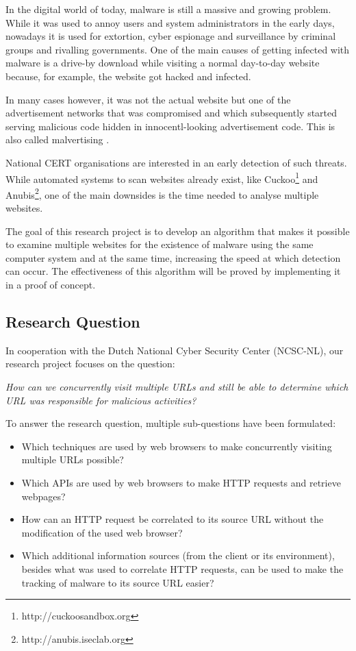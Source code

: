 In the digital world of today, malware is still a massive and growing problem. While it was used to annoy users and system administrators in the early days, nowadays it is used for extortion, cyber espionage and surveillance by criminal groups and rivalling governments. One of the main causes of getting infected with malware is a drive-by download while visiting a normal day-to-day website because, for example, the website got hacked and infected. 

In many cases \cite{proofpoint,foxittelegraaf,foxityahoo} however, it was not the actual website but one of the advertisement networks that was compromised and which subsequently started serving malicious code hidden in innocentl-looking advertisement code. This is also called malvertising \cite{Li2012}.

National CERT organisations are interested in an early detection of such threats. While automated systems to scan websites already exist, like Cuckoo\footnote{http://cuckoosandbox.org} and Anubis\footnote{http://anubis.iseclab.org}, one of the main downsides is the time needed to analyse multiple websites.

The goal of this research project is to develop an algorithm that makes it possible to examine multiple websites for the existence of malware using the same computer system and at the same time, increasing the speed at which detection can occur. The effectiveness of this algorithm will be proved by implementing it in a proof of concept.

\subsection{Research Question}

In cooperation with the Dutch National Cyber Security Center (NCSC-NL), our research project focuses on the question:

\textit{How can we concurrently visit multiple URLs and still be able to determine which URL was responsible for malicious activities?}

To answer the research question, multiple sub-questions have been formulated:

\begin{itemize}
\item Which techniques are used by web browsers to make concurrently visiting multiple URLs possible?
\item Which APIs are used by web browsers to make HTTP requests and retrieve webpages?
\item How can an HTTP request be correlated to its source URL without the modification of the used web browser?
\item Which additional information sources (from the client or its environment), besides what was used to correlate HTTP requests, can be used to make the tracking of malware to its source URL easier?
\end{itemize}

